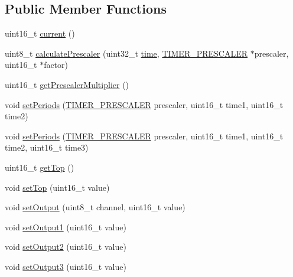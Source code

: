 \subsection*{Public Member Functions}
\begin{DoxyCompactItemize}
\item 
uint16\-\_\-t \hyperlink{classmhvlib_1_1_timer_implementation_a5c5b9a3d3911caaea2bf03a8c15bee9e}{current} ()
\item 
uint8\-\_\-t \hyperlink{classmhvlib_1_1_timer_implementation_a6f4a1da5198291f97365070555c4572a}{calculate\-Prescaler} (uint32\-\_\-t \hyperlink{structmhvlib_1_1time}{time}, \hyperlink{namespacemhvlib_ae280d2a7103fc576dbd0e8880c574e6c}{T\-I\-M\-E\-R\-\_\-\-P\-R\-E\-S\-C\-A\-L\-E\-R} $\ast$prescaler, uint16\-\_\-t $\ast$factor)
\item 
uint16\-\_\-t \hyperlink{classmhvlib_1_1_timer_implementation_ae2ce66b4210629f464cc5d4cdf1887c2}{get\-Prescaler\-Multiplier} ()
\item 
void \hyperlink{classmhvlib_1_1_timer_implementation_a1a733b0365ea87136390b22af8c7c417}{set\-Periods} (\hyperlink{namespacemhvlib_ae280d2a7103fc576dbd0e8880c574e6c}{T\-I\-M\-E\-R\-\_\-\-P\-R\-E\-S\-C\-A\-L\-E\-R} prescaler, uint16\-\_\-t time1, uint16\-\_\-t time2)
\item 
void \hyperlink{classmhvlib_1_1_timer_implementation_a08d0df48d1aa20b749850f0971d7fb4a}{set\-Periods} (\hyperlink{namespacemhvlib_ae280d2a7103fc576dbd0e8880c574e6c}{T\-I\-M\-E\-R\-\_\-\-P\-R\-E\-S\-C\-A\-L\-E\-R} prescaler, uint16\-\_\-t time1, uint16\-\_\-t time2, uint16\-\_\-t time3)
\item 
uint16\-\_\-t \hyperlink{classmhvlib_1_1_timer_implementation_ac6a2dd5c06e8c3ae5bace6d964cc1154}{get\-Top} ()
\item 
void \hyperlink{classmhvlib_1_1_timer_implementation_a18d5d9f91b5992b0753b3f945200de96}{set\-Top} (uint16\-\_\-t value)
\item 
void \hyperlink{classmhvlib_1_1_timer_implementation_a68dc788e7ca5a40e7fd066b663af4787}{set\-Output} (uint8\-\_\-t channel, uint16\-\_\-t value)
\item 
void \hyperlink{classmhvlib_1_1_timer_implementation_a81e6a2c9593f7b88c2078ad4c09c28f5}{set\-Output1} (uint16\-\_\-t value)
\item 
void \hyperlink{classmhvlib_1_1_timer_implementation_ac5bd2fc62ca3df1b3fd0e0f1051dcdcd}{set\-Output2} (uint16\-\_\-t value)
\item 
void \hyperlink{classmhvlib_1_1_timer_implementation_a23b3e5537973765879e16e07a5fbd35c}{set\-Output3} (uint16\-\_\-t value)

\end{DoxyCompactItemize}
